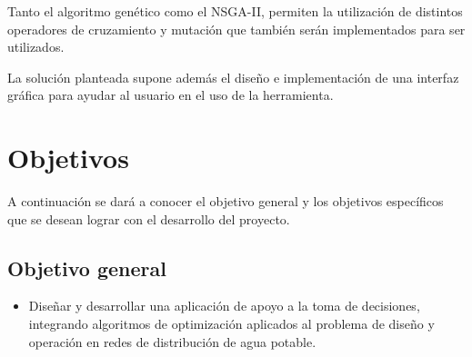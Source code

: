 \documentclass[11pt,letterpaper]{article}
\begin{document}
Tanto el algoritmo genético como el NSGA-II, permiten la utilización de distintos operadores de cruzamiento y mutación que también serán implementados para ser utilizados. 

La solución planteada supone además el diseño e implementación de una interfaz gráfica para ayudar al usuario en el uso de la herramienta.

\section{Objetivos}

A continuación se dará a conocer el objetivo general y los objetivos específicos que se desean lograr con el desarrollo del proyecto.

\subsection{Objetivo general}

\begin{itemize}
\item Diseñar y desarrollar una aplicación de apoyo a la toma de decisiones, integrando algoritmos de optimización aplicados al problema de diseño y operación en redes de distribución de agua potable.
\end{itemize}
\end{document}
